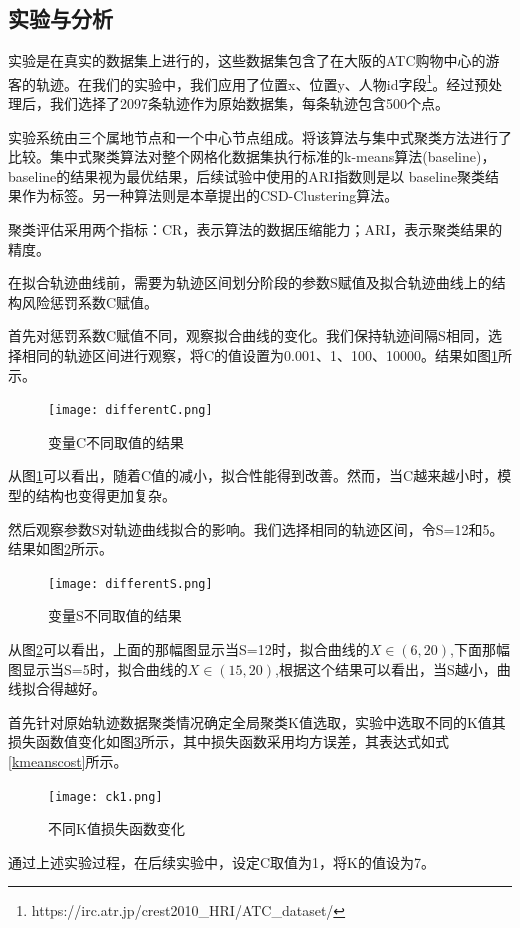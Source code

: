 \subsection{实验与分析}
实验是在真实的数据集上进行的，这些数据集包含了在大阪的ATC购物中心的游客的轨迹。在我们的实验中，我们应用了位置x、位置y、人物id字段\footnote[1]{https://irc.atr.jp/crest2010\_HRI/ATC\_dataset/}。经过预处理后，我们选择了2097条轨迹作为原始数据集，每条轨迹包含500个点。

实验系统由三个属地节点和一个中心节点组成。将该算法与集中式聚类方法进行了比较。集中式聚类算法对整个网格化数据集执行标准的k-means算法(baseline)， baseline的结果视为最优结果，后续试验中使用的ARI指数则是以 baseline聚类结果作为标签。另一种算法则是本章提出的CSD-Clustering算法。

聚类评估采用两个指标：CR，表示算法的数据压缩能力；ARI，表示聚类结果的精度。

在拟合轨迹曲线前，需要为轨迹区间划分阶段的参数S赋值及拟合轨迹曲线上的结构风险惩罚系数C赋值。

首先对惩罚系数C赋值不同，观察拟合曲线的变化。我们保持轨迹间隔S相同，选择相同的轨迹区间进行观察，将C的值设置为0.001、1、100、10000。结果如图\ref{differentC}所示。
\begin{figure}[H]
	\texttt{[image: differentC.png]}
	\caption{变量C不同取值的结果}
	\label{differentC}
\end{figure}

从图\ref{differentC}可以看出，随着C值的减小，拟合性能得到改善。然而，当C越来越小时，模型的结构也变得更加复杂。

然后观察参数S对轨迹曲线拟合的影响。我们选择相同的轨迹区间，令S=12和5。结果如图\ref{differentS}所示。
\begin{figure}[H]
	\texttt{[image: differentS.png]}
	\caption{变量S不同取值的结果}
	\label{differentS}
\end{figure}

从图\ref{differentS}可以看出，上面的那幅图显示当S=12时，拟合曲线的$X\in(6,20)$,下面那幅图显示当S=5时，拟合曲线的$X\in(15,20)$,根据这个结果可以看出，当S越小，曲线拟合得越好。



首先针对原始轨迹数据聚类情况确定全局聚类K值选取，实验中选取不同的K值其损失函数值变化如图\ref{ck}所示，其中损失函数采用均方误差，其表达式如式\ref{kmeanscost}所示。
\begin{figure}[H]
	\texttt{[image: ck1.png]}
	\caption{不同K值损失函数变化}
	\label{ck}
\end{figure}

通过上述实验过程，在后续实验中，设定C取值为1，将K的值设为7。

